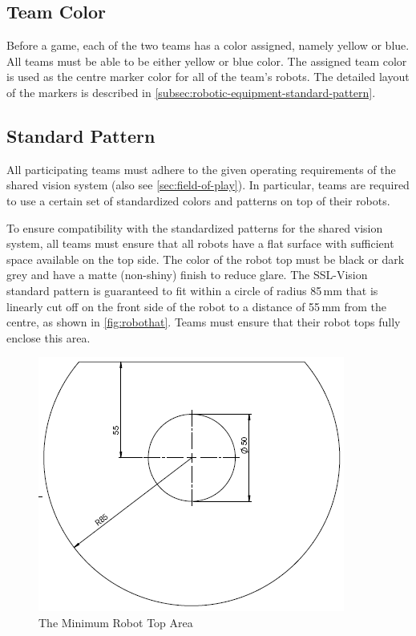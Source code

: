 \subsection{Team Color}
Before a game, each of the two teams has a color assigned, namely yellow or blue.
All teams must be able to be either yellow or blue color.
The assigned team color is used as the centre marker color for all of the team's robots.
The detailed layout of the markers is described in \autoref{subsec:robotic-equipment-standard-pattern}.

\subsection{Standard Pattern}\label{subsec:robotic-equipment-standard-pattern}
All participating teams must adhere to the given operating requirements of the shared vision system (also see \autoref{sec:field-of-play}).
In particular, teams are required to use a certain set of standardized colors and patterns on top of their robots.

To ensure compatibility with the standardized patterns for the shared vision system, all teams must ensure that all robots have a flat surface with sufficient space available on the top side.
The color of the robot top must be black or dark grey and have a matte (non-shiny) finish to reduce glare.
The SSL-Vision standard pattern is guaranteed to fit within a circle of radius 85\,mm that is linearly cut off on the front side of the robot to a distance of 55\,mm from the centre, as shown in \autoref{fig:robothat}.
Teams must ensure that their robot tops fully enclose this area.

\begin{figure}[ht] %
	\centering
	\includegraphics[width=0.8\columnwidth]{img/robot_hat.png}
	\caption{The Minimum Robot Top Area}
	\label{fig:robothat}
\end{figure}

